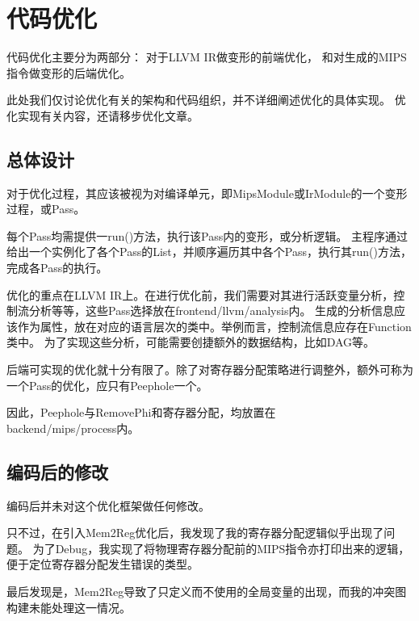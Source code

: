 \section{代码优化}
代码优化主要分为两部分：
对于LLVM IR做变形的前端优化，
和对生成的MIPS指令做变形的后端优化。

此处我们仅讨论优化有关的架构和代码组织，并不详细阐述优化的具体实现。
优化实现有关内容，还请移步优化文章。

\subsection{总体设计}

对于优化过程，其应该被视为对编译单元，即MipsModule或IrModule的一个变形过程，或Pass。

每个Pass均需提供一run()方法，执行该Pass内的变形，或分析逻辑。
主程序通过给出一个实例化了各个Pass的List，并顺序遍历其中各个Pass，执行其run()方法，完成各Pass的执行。

优化的重点在LLVM IR上。在进行优化前，我们需要对其进行活跃变量分析，控制流分析等等，这些Pass选择放在frontend/llvm/analysis内。
生成的分析信息应该作为属性，放在对应的语言层次的类中。举例而言，控制流信息应存在Function类中。
为了实现这些分析，可能需要创捷额外的数据结构，比如DAG等。

后端可实现的优化就十分有限了。除了对寄存器分配策略进行调整外，额外可称为一个Pass的优化，应只有Peephole一个。

因此，Peephole与RemovePhi和寄存器分配，均放置在\\backend/mips/process内。

\subsection{编码后的修改}

编码后并未对这个优化框架做任何修改。

只不过，在引入Mem2Reg优化后，我发现了我的寄存器分配逻辑似乎出现了问题。
为了Debug，我实现了将物理寄存器分配前的MIPS指令亦打印出来的逻辑，便于定位寄存器分配发生错误的类型。

最后发现是，Mem2Reg导致了只定义而不使用的全局变量的出现，而我的冲突图构建未能处理这一情况。